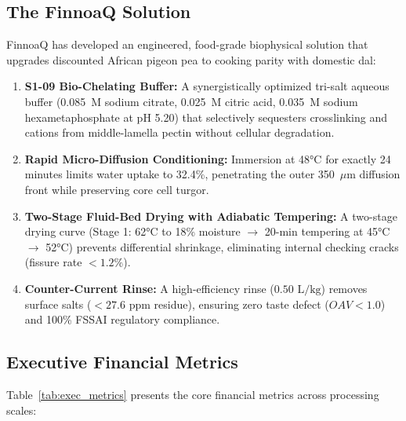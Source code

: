 \documentclass[10pt,a4paper]{article}
\begin{document}
\subsection{The FinnoaQ Solution}
FinnoaQ has developed an engineered, food-grade biophysical solution that upgrades discounted African pigeon pea to cooking parity with domestic dal:
\begin{enumerate}[leftmargin=*]
    \item \textbf{S1-09 Bio-Chelating Buffer:} A synergistically optimized tri-salt aqueous buffer (0.085~M sodium citrate, 0.025~M citric acid, 0.035~M sodium hexametaphosphate at pH 5.20) that selectively sequesters crosslinking  and  cations from middle-lamella pectin without cellular degradation.
    \item \textbf{Rapid Micro-Diffusion Conditioning:} Immersion at 48\si{\celsius} for exactly 24 minutes limits water uptake to 32.4\%, penetrating the outer 350~$\mu$m diffusion front while preserving core cell turgor.
    \item \textbf{Two-Stage Fluid-Bed Drying with Adiabatic Tempering:} A two-stage drying curve (Stage 1: 62\si{\celsius} to 18\% moisture $\to$ 20-min tempering at 45\si{\celsius} $\to$ 52\si{\celsius}) prevents differential shrinkage, eliminating internal checking cracks (fissure rate $< 1.2\%$).
    \item \textbf{Counter-Current Rinse:} A high-efficiency rinse ($0.50\text{ L/kg}$) removes surface salts ($< 27.6\text{ ppm}$ residue), ensuring zero taste defect ($OAV < 1.0$) and 100\% FSSAI regulatory compliance.
\end{enumerate}

\subsection{Executive Financial Metrics}
Table~\ref{tab:exec_metrics} presents the core financial metrics across processing scales:
\end{document}
